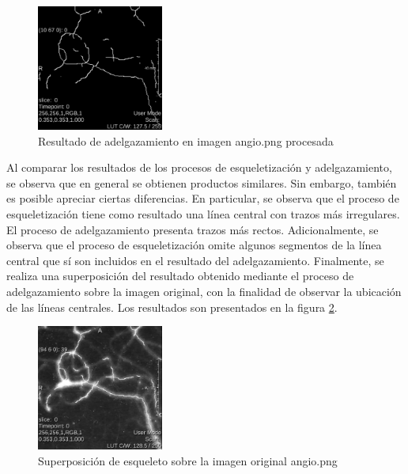 \documentclass{article}
\begin{document}
\begin{figure}[ht]
\begin{center}
\includegraphics[width=0.37\textwidth]{3Esqueleto/3_thin2} %
\caption{Resultado de adelgazamiento en imagen angio.png procesada}
\label{fg:thin2}
\end{center}
\end{figure}
\FloatBarrier

Al comparar los resultados de los procesos de esqueletizaci\'{o}n y adelgazamiento, se observa que en general se obtienen productos similares. Sin embargo, tambi\'{e}n es posible apreciar ciertas diferencias. En particular, se observa que el proceso de esqueletizaci\'{o}n tiene como resultado una l\'{i}nea central con trazos m\'{a}s irregulares. El proceso de adelgazamiento presenta trazos m\'{a}s rectos. Adicionalmente, se observa que el proceso de esqueletizaci\'{o}n omite algunos segmentos de la l\'{i}nea central que s\'{i} son incluidos en el resultado del adelgazamiento. Finalmente, se realiza una superposici\'{o}n del resultado obtenido mediante el proceso de adelgazamiento sobre la imagen original, con la finalidad de observar la ubicaci\'{o}n de las l\'{i}neas centrales. Los resultados son presentados en la figura \ref{fg:sobrepuesta}.

\begin{figure}[ht]
\begin{center}
\includegraphics[width=0.37\textwidth]{3Esqueleto/3_sobrepuesta} %
\caption{Superposici\'{o}n de esqueleto sobre la imagen original angio.png}
\label{fg:sobrepuesta}
\end{center}
\end{figure}
\FloatBarrier
\end{document}
